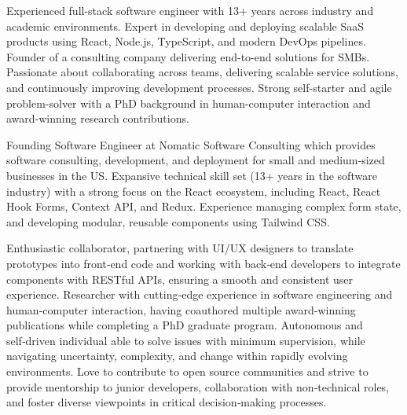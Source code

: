 
\begin{cvparagraph}

\begin{briefSection}
Experienced full-stack software engineer with 13+ years across industry and academic environments.
Expert in developing and deploying scalable SaaS products using React, Node.js, TypeScript, and modern DevOps pipelines.
Founder of a consulting company delivering end-to-end solutions for SMBs.
Passionate about collaborating across teams, delivering scalable service solutions, and continuously improving development processes.
Strong self-starter and agile problem-solver with a PhD background in human-computer interaction and award-winning research contributions.  
\end{briefSection}

\begin{detailSection}
Founding Software Engineer at Nomatic Software Consulting which provides software consulting, development, and deployment for small and medium‑sized businesses in the US. Expansive technical skill set (13+ years in the software industry) with a strong focus on the React ecosystem, including React, React Hook Forms, Context API, and Redux. 
Experience managing complex form state, and developing modular, reusable components using Tailwind CSS.

Enthusiastic collaborator, partnering with UI/UX designers to translate prototypes into front‑end code and working with back‑end developers to integrate components with RESTful APIs, ensuring a smooth and consistent user experience. 
Researcher with cutting‑edge experience in software engineering and human‑computer interaction, having coauthored multiple award‑winning publications while completing a PhD graduate program. 
Autonomous and self‑driven individual able to solve issues with minimum supervision, while navigating uncertainty, complexity, and change within rapidly evolving environments. 
Love to contribute to open source communities and strive to provide mentorship to junior developers, collaboration with non‑technical roles, and foster diverse viewpoints in critical decision‑making processes.
\end{detailSection}

\end{cvparagraph}
